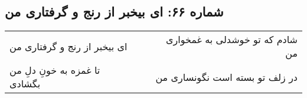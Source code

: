 \begin{center}
\section*{شماره ۶۶: ای بیخبر از رنج و گرفتاری من}
\label{sec:066}
\begin{longtable}{l p{0.5cm} r}
ای بیخبر از رنج و گرفتاری من
&&
شادم که تو خوشدلی به غمخواری من
\\
تا غمزه به خونِ دلِ من بگشادی
&&
در زلف تو بسته است نگونساری من
\\
\end{longtable}
\end{center}

